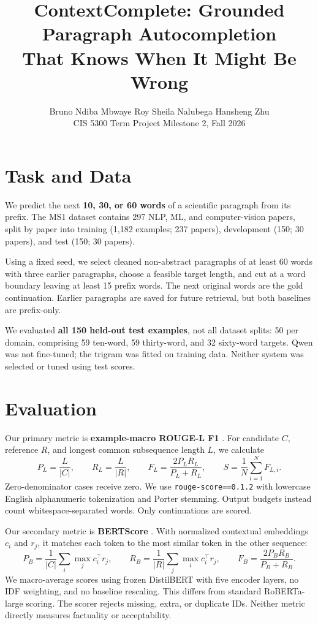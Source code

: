 \documentclass[11pt]{article}
\title{\vspace{-1.6em}\textbf{ContextComplete: Grounded Paragraph Autocompletion\\ That Knows When It Might Be Wrong}}
\author{Bruno Ndiba Mbwaye Roy \quad Sheila Nalubega\quad 
Hansheng Zhu \\
\small CIS 5300 Term Project Milestone 2, Fall 2026}
\date{\vspace{-2.2em}}
\begin{document}
\maketitle
\section*{Task and Data}
We predict the next \textbf{10, 30, or 60 words} of a scientific paragraph from its prefix. The MS1 dataset contains 297 NLP, ML, and computer-vision papers, split by paper into training (1,182 examples; 237 papers), development (150; 30 papers), and test (150; 30 papers).

Using a fixed seed, we select cleaned non-abstract paragraphs of at least 60 words with three earlier paragraphs, choose a feasible target length, and cut at a word boundary leaving at least 15 prefix words. The next original words are the gold continuation. Earlier paragraphs are saved for future retrieval, but both baselines are prefix-only.

We evaluated \textbf{all 150 held-out test examples}, not all dataset splits: 50 per domain, comprising 59 ten-word, 59 thirty-word, and 32 sixty-word targets. Qwen was not fine-tuned; the trigram was fitted on training data. Neither system was selected or tuned using test scores.

\section*{Evaluation}
Our primary metric is \textbf{example-macro ROUGE-L F1} \cite{lin}. For candidate $C$, reference $R$, and longest common subsequence length $L$, we calculate
\[
P_L=\frac{L}{|C|},\qquad R_L=\frac{L}{|R|},\qquad
F_L=\frac{2P_LR_L}{P_L+R_L},\qquad
S=\frac{1}{N}\sum_{i=1}^{N}F_{L,i}.
\]
Zero-denominator cases receive zero. We use \texttt{rouge-score==0.1.2} with lowercase English alphanumeric tokenization and Porter stemming. Output budgets instead count whitespace-separated words. Only continuations are scored.

Our secondary metric is \textbf{BERTScore} \cite{zhang}. With normalized contextual embeddings $c_i$ and $r_j$, it matches each token to the most similar token in the other sequence:
\[
P_B=\frac{1}{|C|}\sum_i\max_j c_i^\top r_j,\qquad
R_B=\frac{1}{|R|}\sum_j\max_i c_i^\top r_j,\qquad
F_B=\frac{2P_BR_B}{P_B+R_B}.
\]
We macro-average scores using frozen DistilBERT with five encoder layers, no IDF weighting, and no baseline rescaling. This differs from standard RoBERTa-large scoring. The scorer rejects missing, extra, or duplicate IDs. Neither metric directly measures factuality or acceptability.
\end{document}
